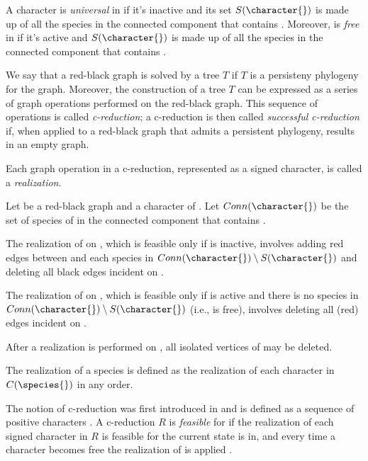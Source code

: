 A character \character{} is \emph{universal} in \grb{} if it's inactive and its set $S(\character{})$ is made up of all the species in the connected component that contains \character{}. Moreover, \character{} is \emph{free} in \grb{} if it's active and $S(\character{})$ is made up of all the species in the connected component that contains \character{}.

We say that a red-black graph \grb{} is solved by a tree $T$ if $T$ is a persisteny phylogeny for the graph. Moreover, the construction of a tree $T$ can be expressed as a series of graph operations performed on the red-black graph.
This sequence of operations is called \emph{c-reduction}; a c-reduction is then called \emph{successful c-reduction} if, when applied to a red-black graph that admits a persistent phylogeny, results in an empty graph.

Each graph operation in a c-reduction, represented as a signed character, is called a \emph{realization}.

\begin{definition}[Realization]\label{definition:realization}
  Let \grb{} be a red-black graph and \character{} a character of \grb{}.
  Let $Conn(\character{})$ be the set of species of \grb{} in the connected component that contains \character{}.

  The realization of \character[][+] on \grb{}, which is feasible only if \character{} is inactive, involves adding red edges between \character{} and each species in $Conn(\character{}) \setminus S(\character{})$ and deleting all black edges incident on \character{}.

  The realization of \character[][-] on \grb{}, which is feasible only if \character{} is active and there is no species in $Conn(\character{}) \setminus S(\character{})$ (i.e., \character{} is free), involves deleting all (red) edges incident on \character{}.

  After a realization is performed on \grb{}, all isolated vertices of \grb{} may be deleted.
\end{definition}

The realization of a species \species{} is defined as the realization of each character in $C(\species{})$ in any order.

The notion of c-reduction was first introduced in \cite{PPPbin2012} and is defined as a sequence of positive characters \character[][+]. A c-reduction $R$ is \emph{feasible} for \grb{} if the realization of each signed character in $R$ is feasible for the current state  \grb{} is in, and every time a character \character[i] becomes free the realization of \character[i][-] is applied \cite{PPPcgraph2016}.

